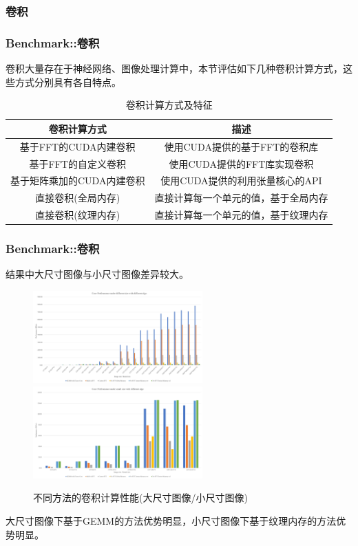 \documentclass[10pt,aspectratio=169,mathserif]{beamer}
\begin{document}
	\subsubsection{卷积}
	\begin{frame}
		\frametitle{Benchmark::卷积}
		卷积大量存在于神经网络、图像处理计算中，本节评估如下几种卷积计算方式，这些方式分别具有各自特点。
		\begin{table}
			\centering
			\caption{卷积计算方式及特征}
			\begin{tabular}{cc}
				\toprule
				卷积计算方式	&	描述\\
				\midrule
				基于FFT的CUDA内建卷积 & 使用CUDA提供的基于FFT的卷积库\\
				基于FFT的自定义卷积 & 使用CUDA提供的FFT库实现卷积\\
				基于矩阵乘加的CUDA内建卷积 & 使用CUDA提供的利用张量核心的API\\
				直接卷积(全局内存) & 直接计算每一个单元的值，基于全局内存\\
				直接卷积(纹理内存) & 直接计算每一个单元的值，基于纹理内存\\
				\bottomrule
			\end{tabular}
		\end{table}
	\end{frame}

	\begin{frame}
		\frametitle{Benchmark::卷积}
		结果中大尺寸图像与小尺寸图像差异较大。
		\begin{figure}
			\centering
			\includegraphics[width=6.5cm]{figures/CONVPerf.jpg}
			\includegraphics[width=6.5cm]{figures/CONVSubPerf.jpg}
			\caption{不同方法的卷积计算性能(大尺寸图像/小尺寸图像)}\label{Fig.CONV}
		\end{figure}
		大尺寸图像下基于GEMM的方法优势明显，小尺寸图像下基于纹理内存的方法优势明显。
	\end{frame}
\end{document}

